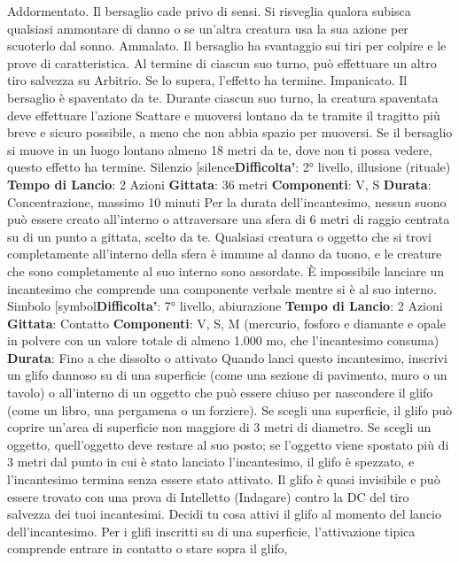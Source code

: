 \begin{multicols}{2}
Addormentato. Il bersaglio cade privo di sensi. Si
risveglia qualora subisca qualsiasi ammontare di danno
o se un’altra creatura usa la sua azione per scuoterlo
dal sonno.
Ammalato. Il bersaglio ha svantaggio sui tiri per colpire
e le prove di caratteristica. Al termine di ciascun suo
turno, può effettuare un altro tiro salvezza su Arbitrio.
Se lo supera, l’effetto ha termine.
Impanicato. Il bersaglio è spaventato da te. Durante
ciascun suo turno, la creatura spaventata deve
effettuare l’azione Scattare e muoversi lontano da te
tramite il tragitto più breve e sicuro possibile, a meno
che non abbia spazio per muoversi. Se il bersaglio si
muove in un luogo lontano almeno 18 metri da te, dove
non ti possa vedere, questo effetto ha termine.
Silenzio
[silence\textbf{Difficolta'}:
2° livello, illusione (rituale)
\textbf{Tempo di Lancio}: 2 Azioni
\textbf{Gittata}: 36 metri
\textbf{Componenti}: V, S
\textbf{Durata}: Concentrazione, massimo 10 minuti
Per la durata dell’incantesimo, nessun suono può
essere creato all’interno o attraversare una sfera di 6
metri di raggio centrata su di un punto a gittata, scelto
da te. Qualsiasi creatura o oggetto che si trovi
completamente all’interno della sfera è immune al
danno da tuono, e le creature che sono completamente
al suo interno sono assordate. È impossibile lanciare un
incantesimo che comprende una componente verbale
mentre si è al suo interno.
Simbolo
[symbol\textbf{Difficolta'}:
7° livello, abiurazione
\textbf{Tempo di Lancio}: 2 Azioni
\textbf{Gittata}: Contatto
\textbf{Componenti}: V, S, M (mercurio, fosforo e diamante e
opale in polvere con un valore totale di almeno 1.000
mo, che l’incantesimo consuma)
\textbf{Durata}: Fino a che dissolto o attivato
Quando lanci questo incantesimo, inscrivi un glifo
dannoso su di una superficie (come una sezione di
pavimento, muro o un tavolo) o all’interno di un oggetto
che può essere chiuso per nascondere il glifo (come un
libro, una pergamena o un forziere). Se scegli una
superficie, il glifo può coprire un’area di superficie non
maggiore di 3 metri di diametro. Se scegli un oggetto,
quell’oggetto deve restare al suo posto; se l’oggetto 
viene spostato più di 3 metri dal punto in cui è stato
lanciato l’incantesimo, il glifo è spezzato, e
l’incantesimo termina senza essere stato attivato.
Il glifo è quasi invisibile e può essere trovato con una
prova di Intelletto (Indagare) contro la DC del tiro
salvezza dei tuoi incantesimi.
Decidi tu cosa attivi il glifo al momento del lancio
dell’incantesimo.
Per i glifi inscritti su di una superficie, l’attivazione tipica
comprende entrare in contatto o stare sopra il glifo,

\end{multicols}
